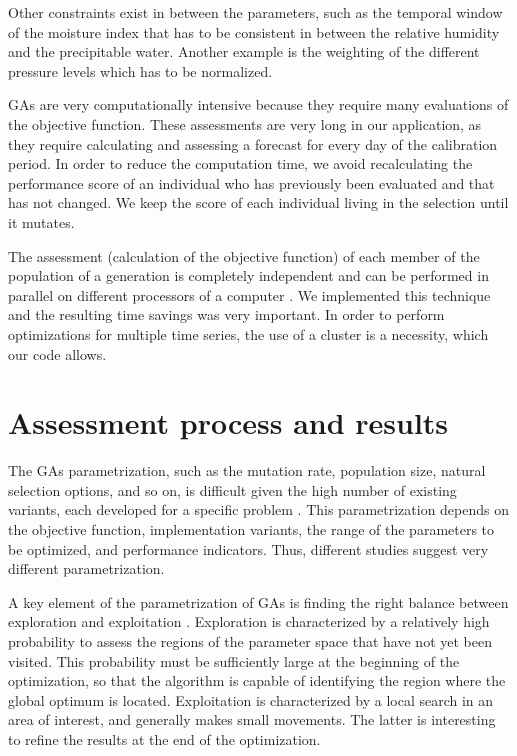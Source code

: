 \documentclass[twocol]{ametsoc}
\begin{document}
Other constraints exist in between the parameters, such as the temporal window of the moisture index that has to be consistent in between the relative humidity and the precipitable water. Another example is the weighting of the different pressure levels which has to be normalized.

GAs are very computationally intensive because they require many evaluations of the objective function. These assessments are very long in our application, as they require calculating and assessing a forecast for every day of the calibration period. In order to reduce the computation time, we avoid recalculating the performance score of an individual who has previously been evaluated and that has not changed. We keep the score of each individual living in the selection until it mutates.

The assessment (calculation of the objective function) of each member of the population of a generation is completely independent and can be performed in parallel on different processors of a computer \citep{Alliot2005}. We implemented this technique and the resulting time savings was very important. In order to perform optimizations for multiple time series, the use of a cluster is a necessity, which our code allows.


\section{Assessment process and results}

The GAs parametrization, such as the mutation rate, population size, natural selection options, and so on, is difficult given the high number of existing variants, each developed for a specific problem \citep{Haupt2004, Costa2007a}. This parametrization depends on the objective function, implementation variants, the range of the parameters to be optimized, and performance indicators. Thus, different studies suggest very different parametrization.

A key element of the parametrization of GAs is finding the right balance between exploration and exploitation \citep{Back1992a, Smith1997a}. Exploration is characterized by a relatively high probability to assess the regions of the parameter space that have not yet been visited. This probability must be sufficiently large at the beginning of the optimization, so that the algorithm is capable of identifying the region where the global optimum is located. Exploitation is characterized by a local search in an area of interest, and generally makes small movements. The latter is interesting to refine the results at the end of the optimization.
\end{document}

